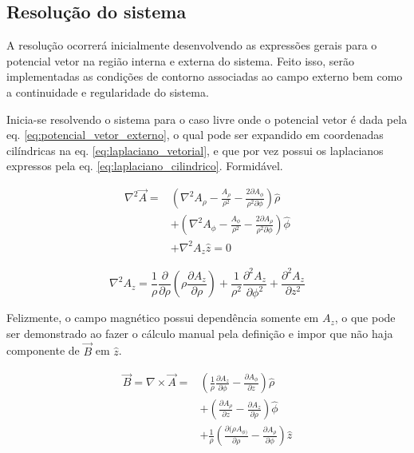 \documentclass[%
 reprint,
 amsmath,amssymb,
 aps,
]{revtex4-1}
\begin{document}
\subsection{Resolução do sistema}

A resolução ocorrerá inicialmente desenvolvendo as expressões gerais para o potencial vetor na região interna e externa do sistema. Feito isso, serão implementadas as condições de contorno associadas ao campo externo bem como a continuidade e regularidade do sistema.

Inicia-se resolvendo o sistema para o caso livre onde o potencial vetor é dada pela eq. \ref{eq:potencial_vetor_externo}, o qual pode ser expandido em coordenadas cilíndricas na eq. \ref{eq:laplaciano_vetorial}, e que por vez possui os laplacianos expressos pela eq. \ref{eq:laplaciano_cilindrico}. Formidável.

\begin{equation}
    \label{eq:laplaciano_vetorial}
    \begin{split}
     \nabla^2 \vec{A} = &(\nabla^2 A_{\rho} - \frac{A_{\rho}}{\rho^2} - \frac{2 \partial A_{\phi} }{\rho^2 \partial \phi}) \hat{\rho} \\
    & + (\nabla^2 A_{\phi} - \frac{A_{\phi}}{\rho^2} - \frac{2 \partial A_{\rho} }{\rho^2 \partial \phi}) \hat{\phi} \\
    & + \nabla^2 A_z \hat{z} = 0
    \end{split}
\end{equation}

\begin{equation}
    \label{eq:laplaciano_cilindrico}
    \nabla^2 A_z = \frac{1}{\rho} \frac{\partial}{\partial \rho} (\rho \frac{\partial A_z}{\partial \rho}) + \frac{1}{\rho^2}\frac{\partial^2 A_z}{\partial \phi^2} + \frac{\partial^2 A_z}{\partial z^2}
\end{equation}

Felizmente, o campo magnético possui dependência somente em $A_z$, o que pode ser demonstrado ao fazer o cálculo manual pela definição e impor que não haja componente de $\vec{B}$ em $\hat{z}$. 

\begin{equation}
    \label{eq:curl_cilindrico}
    \begin{split}
    \vec{B} = \nabla \times \vec{A} = &(\frac{1}{\rho}\frac{\partial A_z}{\partial \phi} - \frac{\partial A_{\phi}}{\partial z}) \hat{\rho} \\
    &+ (\frac{\partial A_{\rho}}{\partial z} - \frac{\partial A_z}{\partial \rho}) \hat{\phi} \\
    &+ \frac{1}{\rho} (\frac{\partial (\rho A_{\phi)}}{\partial {\rho}} - \frac{\partial A_{\rho}}{\partial \phi}) \hat{z}
    \end{split}
\end{equation}
\end{document}
